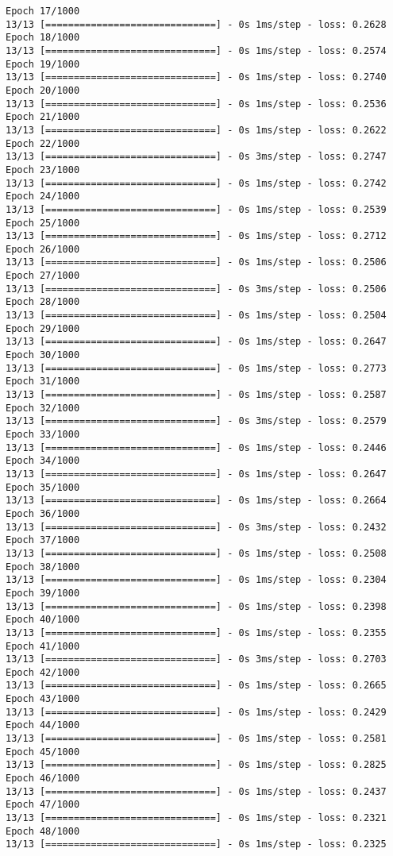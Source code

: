 \documentclass[11pt]{article}
\begin{document}
\begin{Verbatim}[commandchars=\\\{\}]
Epoch 17/1000
13/13 [==============================] - 0s 1ms/step - loss: 0.2628
Epoch 18/1000
13/13 [==============================] - 0s 1ms/step - loss: 0.2574
Epoch 19/1000
13/13 [==============================] - 0s 1ms/step - loss: 0.2740
Epoch 20/1000
13/13 [==============================] - 0s 1ms/step - loss: 0.2536
Epoch 21/1000
13/13 [==============================] - 0s 1ms/step - loss: 0.2622
Epoch 22/1000
13/13 [==============================] - 0s 3ms/step - loss: 0.2747
Epoch 23/1000
13/13 [==============================] - 0s 1ms/step - loss: 0.2742
Epoch 24/1000
13/13 [==============================] - 0s 1ms/step - loss: 0.2539
Epoch 25/1000
13/13 [==============================] - 0s 1ms/step - loss: 0.2712
Epoch 26/1000
13/13 [==============================] - 0s 1ms/step - loss: 0.2506
Epoch 27/1000
13/13 [==============================] - 0s 3ms/step - loss: 0.2506
Epoch 28/1000
13/13 [==============================] - 0s 1ms/step - loss: 0.2504
Epoch 29/1000
13/13 [==============================] - 0s 1ms/step - loss: 0.2647
Epoch 30/1000
13/13 [==============================] - 0s 1ms/step - loss: 0.2773
Epoch 31/1000
13/13 [==============================] - 0s 1ms/step - loss: 0.2587
Epoch 32/1000
13/13 [==============================] - 0s 3ms/step - loss: 0.2579
Epoch 33/1000
13/13 [==============================] - 0s 1ms/step - loss: 0.2446
Epoch 34/1000
13/13 [==============================] - 0s 1ms/step - loss: 0.2647
Epoch 35/1000
13/13 [==============================] - 0s 1ms/step - loss: 0.2664
Epoch 36/1000
13/13 [==============================] - 0s 3ms/step - loss: 0.2432
Epoch 37/1000
13/13 [==============================] - 0s 1ms/step - loss: 0.2508
Epoch 38/1000
13/13 [==============================] - 0s 1ms/step - loss: 0.2304
Epoch 39/1000
13/13 [==============================] - 0s 1ms/step - loss: 0.2398
Epoch 40/1000
13/13 [==============================] - 0s 1ms/step - loss: 0.2355
Epoch 41/1000
13/13 [==============================] - 0s 3ms/step - loss: 0.2703
Epoch 42/1000
13/13 [==============================] - 0s 1ms/step - loss: 0.2665
Epoch 43/1000
13/13 [==============================] - 0s 1ms/step - loss: 0.2429
Epoch 44/1000
13/13 [==============================] - 0s 1ms/step - loss: 0.2581
Epoch 45/1000
13/13 [==============================] - 0s 1ms/step - loss: 0.2825
Epoch 46/1000
13/13 [==============================] - 0s 1ms/step - loss: 0.2437
Epoch 47/1000
13/13 [==============================] - 0s 1ms/step - loss: 0.2321
Epoch 48/1000
13/13 [==============================] - 0s 1ms/step - loss: 0.2325

\end{Verbatim}
\end{document}
